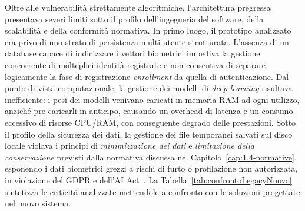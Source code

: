Oltre alle vulnerabilità strettamente algoritmiche, l'architettura pregressa presentava severi limiti sotto il profilo dell'ingegneria del software, della scalabilità e della conformità normativa.
In primo luogo, il prototipo analizzato era privo di uno strato di persistenza multi-utente strutturata. L'assenza di un database capace di indicizzare i vettori biometrici impediva la gestione concorrente di molteplici identità registrate e non consentiva di separare logicamente la fase di registrazione \textit{enrollment} da quella di autenticazione.
Dal punto di vista computazionale, la gestione dei modelli di \textit{deep learning} risultava inefficiente: i pesi dei modelli venivano caricati in memoria RAM ad ogni utilizzo, anziché pre-caricarli in anticipo, causando un overhead di latenza e un consumo eccessivo di risorse CPU/RAM, con conseguente degrado delle prestazioni.
Sotto il profilo della sicurezza dei dati, la gestione dei file temporanei salvati sul disco locale violava i principi di \textit{minimizzazione dei dati} e \textit{limitazione della conservazione} previsti dalla normativa discussa nel Capitolo~\ref{cap:1.4-normative}, esponendo i dati biometrici grezzi a rischi di furto o profilazione non autorizzata, in violazione del GDPR e dell'AI Act~\cite{sanzGoverningPrivacyPreservingFace2026}.
La Tabella~\ref{tab:confrontoLegacyNuovo} sintetizza le criticità analizzate mettendole a confronto con le soluzioni progettate nel nuovo sistema.
